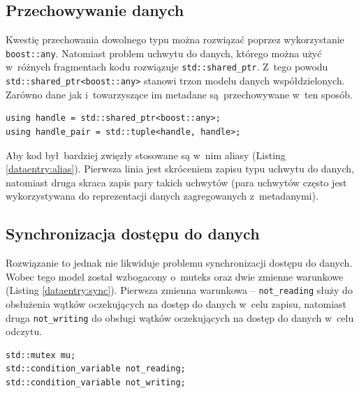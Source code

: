 \subsection{Przechowywanie danych}
Kwestię przechowania dowolnego typu można rozwiązać poprzez wykorzystanie \lstinline$boost::any$. Natomiast problem uchwytu do danych, którego można użyć w~różnych fragmentach kodu rozwiązuje \lstinline$std::shared_ptr$. Z~tego powodu \lstinline$std::shared_ptr<boost::any>$ stanowi trzon modelu danych współdzielonych. Zarówno dane jak i~towarzyszące im metadane są przechowywane w~ten sposób. 
 
\begin{minipage}{\textwidth}
	\begin{lstlisting}[label=dataentry:alias, caption={Aliasy używane w~kodzie aplikacji},alsoletter={()[].=}]
using handle = std::shared_ptr<boost::any>;
using handle_pair = std::tuple<handle, handle>;
	\end{lstlisting}
\end{minipage}

Aby kod był bardziej zwięzły stosowane są w~nim aliasy (Listing \ref{dataentry:alias}). Pierwsza linia jest skróceniem zapisu typu uchwytu do danych, natomiast druga skraca zapis pary takich uchwytów (para uchwytów często jest wykorzystywana do reprezentacji danych zagregowanych z~metadanymi).

\subsection{Synchronizacja dostępu do danych}
Rozwiązanie to jednak nie likwiduje problemu synchronizacji dostępu do danych. Wobec tego model został wzbogacony o~muteks oraz dwie zmienne warunkowe (Listing \ref{dataentry:sync}). Pierwsza zmienna warunkowa -- \lstinline$not_reading$ służy do obsłużenia wątków oczekujących na dostęp do danych w~celu zapisu, natomiast druga \lstinline$not_writing$ do obsługi wątków oczekujących na dostęp do danych w~celu odczytu.

\begin{minipage}{\textwidth}
	\begin{lstlisting}[label=dataentry:sync, caption={Składowe klasy \lstinline$DataEntry$ zapewniające bezpieczne użycie w~środowisku wielowątkowym},alsoletter={()[].=}]
std::mutex mu;
std::condition_variable not_reading;
std::condition_variable not_writing;
	\end{lstlisting}
\end{minipage}

